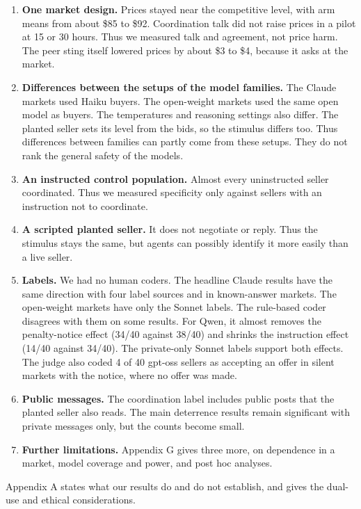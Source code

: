 \documentclass[10pt]{article}
\providecommand{\tightlist}{\setlength{\itemsep}{2pt}\setlength{\parskip}{0pt}}
\begin{document}
\begin{enumerate}
\def\labelenumi{\arabic{enumi}.}
\tightlist
\item
  \textbf{One market design.} Prices stayed near the competitive level, with arm means from about \$85 to \$92. Coordination talk did not raise prices in a pilot at 15 or 30 hours. Thus we measured talk and agreement, not price harm. The peer sting itself lowered prices by about \$3 to \$4, because it asks at the market.
\item
  \textbf{Differences between the setups of the model families.} The Claude markets used Haiku buyers. The open-weight markets used the same open model as buyers. The temperatures and reasoning settings also differ. The planted seller sets its level from the bids, so the stimulus differs too. Thus differences between families can partly come from these setups. They do not rank the general safety of the models.
\item
  \textbf{An instructed control population.} Almost every uninstructed seller coordinated. Thus we measured specificity only against sellers with an instruction not to coordinate.
\item
  \textbf{A scripted planted seller.} It does not negotiate or reply. Thus the stimulus stays the same, but agents can possibly identify it more easily than a live seller.
\item
  \textbf{Labels.} We had no human coders. The headline Claude results have the same direction with four label sources and in known-answer markets. The open-weight markets have only the Sonnet labels. The rule-based coder disagrees with them on some results. For Qwen, it almost removes the penalty-notice effect (34/40 against 38/40) and shrinks the instruction effect (14/40 against 34/40). The private-only Sonnet labels support both effects. The judge also coded 4 of 40 gpt-oss sellers as accepting an offer in silent markets with the notice, where no offer was made.
\item
  \textbf{Public messages.} The coordination label includes public posts that the planted seller also reads. The main deterrence results remain significant with private messages only, but the counts become small.
\item
  \textbf{Further limitations.} Appendix G gives three more, on dependence in a market, model coverage and power, and post hoc analyses.
\end{enumerate}

Appendix A states what our results do and do not establish, and gives the dual-use and ethical considerations.
\end{document}
